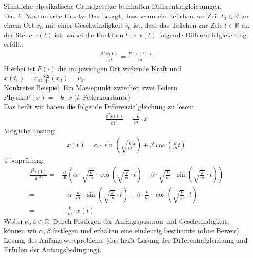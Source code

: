 \begin{Beispiel}{
	Sämtliche physikalische Grundgesetze beinhalten 
	Differentialgleichungen.\\
	Das 2. Newton'sche Gesetz: Das besagt, dass wenn ein Teilchen zur Zeit 
	$t_0 \in \mathbb{R}$ an einem Ort $x_0$ mit einer Geschwindigkeit $v_0$ 
	ist, dass das Teilchen zur Zeit $t \in \mathbb{R}$ an der Stelle 
	$x(t)$ ist, wobei die Funktion $t \mapsto x(t)$ folgende 
	Differentialgleichung erfüllt:
	\begin{align*}
		\frac{\mathrm{d^2x(t)}}{\mathrm{dt^2}} = \frac{F(x(t))}{m}
	\end{align*}
	Hierbei ist $F(\cdot)$ die im jeweiligen Ort wirkende Kraft und \\
	$x(t_0) = x_0, \frac{\mathrm{dx}}{\mathrm{dt}}(x_0) = v_0$.\\
	\underline{Konkretes Beispiel:} Ein Massepunkt zwischen zwei Federn \\
	Physik:$F(x) = -k \cdot x$ ($k$ Federkonstante)\\
	Das heißt wir haben die folgende Differenzialgleichung zu lösen:
	\begin{align*}
		\frac{\mathrm{d^2x(t)}}{\mathrm{dt^2}} = \frac{-k}{m} \cdot x
	\end{align*}
	Mögliche Lösung:
	\begin{align*}
		x(t) = \alpha \cdot \sin\left(\sqrt{\frac{k}{m}}t\right) 
			+ \beta \cos\left(\frac{k}{m}t\right)
	\end{align*}
	Überprüfung:
	\begin{align*}
	\frac{\mathrm{d^2x(t)}}{\mathrm{dt^2}} = 
	&\frac{\mathrm{d}}{\mathrm{dt}} \left(\alpha \cdot \sqrt{\frac{k}{m}} 
		\cdot \cos\left( \sqrt{\frac{k}{m}} \cdot t\right) - \beta \cdot 	
		\sqrt{\frac{k}{m}} \cdot \sin\left( \sqrt{\frac{k}{m}}
		\cdot t\right)\right) \\
	= & - \alpha \cdot \frac{k}{m} \cdot \sin\left(\sqrt{\frac{k}{m}}\cdot t\right)
		- \beta \cdot \frac{k}{m} \cdot \cos\left(\sqrt{\frac{k}{m}} \cdot t\right) 	
		\\
	= & - \frac{k}{m} \cdot x(t)
	\end{align*}
	Wobei $\alpha, \beta \in \mathbb{R}$. Durch Festlegen der 
	Anfangsposition und Geschwindigkeit, können wir $\alpha, \beta$ 
	festlegen und erhalten eine eindeutig bestimmte (ohne Beweis) Lösung 
	des Anfangswertproblems (das heißt Lösung der Differentialgleichung 
	und Erfüllen der Anfangsbedingung). 
}\end{Beispiel}

